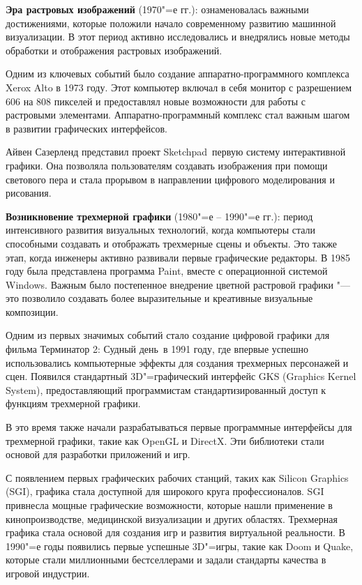 \textbf{Эра растровых изображений} (1970"=е гг.): ознаменовалась важными достижениями, которые положили начало современному развитию машинной визуализации. В этот период активно исследовались и внедрялись новые методы обработки и отображения растровых изображений.

Одним из ключевых событий было создание аппаратно-программного комплекса Xerox Alto в 1973 году. Этот компьютер включал в себя монитор с разрешением 606 на 808 пикселей и предоставлял новые возможности для работы с растровыми элементами. Аппаратно-программный комплекс стал важным шагом в развитии графических интерфейсов.

Айвен Сазерленд представил проект \flqq Sketchpad\frqq\, первую систему интерактивной графики. Она позволяла пользователям создавать изображения при помощи светового пера и стала прорывом в направлении цифрового моделирования и рисования.

\textbf{Возникновение трехмерной графики} (1980"=е -- 1990"=е гг.): период интенсивного развития визуальных технологий, когда компьютеры стали способными создавать и отображать трехмерные сцены и объекты. Это также этап, когда инженеры активно развивали первые графические редакторы. В 1985 году была представлена программа Paint, вместе с операционной системой Windows. Важным было постепенное внедрение цветной растровой графики "--- это позволило создавать более выразительные и креативные визуальные композиции.

Одним из первых значимых событий стало создание цифровой графики для фильма \flqq Терминатор 2: Судный день\frqq\ в 1991 году, где впервые успешно использовались компьютерные эффекты для создания трехмерных персонажей и сцен.
Появился стандартный 3D"=графический интерфейс GKS (Graphics Kernel System), предоставляющий программистам стандартизированный доступ к функциям трехмерной графики.

В это время также начали разрабатываться первые программные интерфейсы для трехмерной графики, такие как OpenGL и DirectX. Эти библиотеки стали основой для разработки приложений и игр.

С появлением первых графических рабочих станций, таких как Silicon Graphics (SGI), графика стала доступной для широкого круга профессионалов. SGI привнесла мощные графические возможности, которые нашли применение в кинопроизводстве, медицинской визуализации и других областях.
Трехмерная графика стала основой для создания игр и развития виртуальной реальности. В 1990"=е годы появились первые успешные 3D"=игры, такие как Doom и Quake, которые стали миллионными бестселлерами и задали стандарты качества в игровой индустрии.

